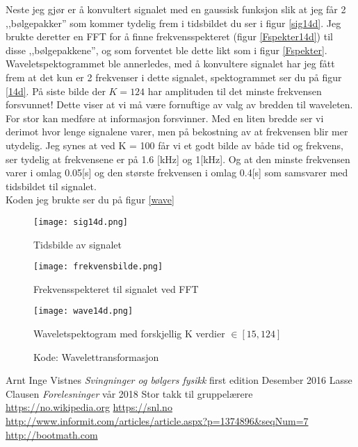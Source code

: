 \documentclass[a4paper,12pt,norsk]{article}
\begin{document}
Neste jeg gjør er å konvultert signalet med en gaussisk funksjon slik at jeg får 2 ,,bølgepakker'' som kommer tydelig frem i tidsbildet du ser i figur \vref{sig14d}. Jeg brukte deretter en FFT for å finne frekvensspekteret (figur \vref{Fspekter14d}) til disse ,,bølgepakkene'', og som forventet ble dette likt som i figur \vref{Fspekter}. Waveletspektogrammet ble annerledes, med å konvultere signalet har jeg fått frem at det kun er 2 frekvenser i dette signalet, spektogrammet ser du på figur \vref{14d}. På siste bilde der $K = 124$ har amplituden til det minste frekvensen forsvunnet! Dette viser at vi må være fornuftige av valg av bredden til waveleten. For stor kan medføre at informasjon forsvinner. Med en liten bredde ser vi derimot hvor lenge signalene varer, men på bekostning av at frekvensen blir mer utydelig. Jeg synes at ved K = 100 får vi et godt bilde av både tid og frekvens, ser tydelig at frekvensene er på 1.6 [kHz] og 1[kHz]. Og at den minste frekvensen varer i omlag 0.05[s] og den største frekvensen i omlag 0.4[s] som samsvarer med tidsbildet til signalet.\\
Koden jeg brukte ser du på figur \vref{wave}

\begin{figure}[h!]
\begin{minipage}{0.5\linewidth}
\texttt{[image: sig14d.png]} 
\caption[Tidsbilde 14.d)]{Tidsbilde av signalet}
\label{sig14d}
\end{minipage}
\hspace{0.5cm}
\begin{minipage}{0.5\linewidth}
\texttt{[image: frekvensbilde.png]} 
\caption[Frekvensspekter 14.d)]{Frekvensspekteret til signalet ved FFT}
\label{Fspekter14d}
\end{minipage}
\hspace{0.5cm}
\begin{minipage}{1.05\linewidth}
\texttt{[image: wave14d.png]} 
\caption[Wavelet spektrogram 14.d)]{Waveletspektogram med forskjellig K verdier $\in [15,124]$}
\label{14d}
\end{minipage}
\end{figure}

\begin{figure}[h!]
\caption{Kode: Wavelettransformasjon}

\label{wave}
\end{figure}



\begin{thebibliography}{}
	Arnt Inge Vistnes
	\textit{Svingninger og bølgers fysikk}
	first edition
	Desember 2016
	Lasse Clausen
	\textit{Forelesninger}
	vår 2018
	Stor takk til gruppelærere
	\url{https://no.wikipedia.org}
	\url{https://snl.no}
	\url{http://www.informit.com/articles/article.aspx?p=1374896&seqNum=7}
	\url{http://bootmath.com}
\end{thebibliography}
\end{document}
